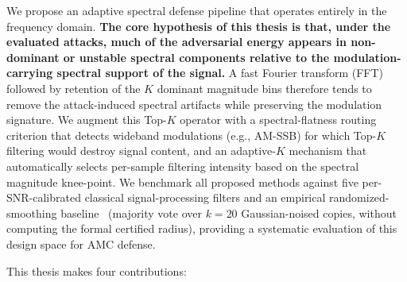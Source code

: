 We propose an adaptive spectral defense pipeline that operates entirely in the
frequency domain. \textbf{The core hypothesis of this thesis is that, under
the evaluated attacks, much of the adversarial energy appears in non-dominant
or unstable spectral components relative to the modulation-carrying spectral
support of the signal.} A fast Fourier transform (FFT) followed by retention
of the $K$ dominant magnitude bins therefore tends to remove the
attack-induced spectral artifacts while preserving the modulation signature.
We augment this Top-$K$ operator with a spectral-flatness routing criterion
that detects wideband modulations (e.g., AM-SSB) for which Top-$K$ filtering
would destroy signal content, and an adaptive-$K$ mechanism that automatically
selects per-sample filtering intensity based on the spectral magnitude
knee-point. We benchmark all proposed methods against five per-SNR-calibrated
classical signal-processing filters and an empirical randomized-smoothing
baseline~\cite{cohen2019certified} (majority vote over $k = 20$
Gaussian-noised copies, without computing the formal certified radius),
providing a systematic evaluation of this design space for AMC defense.

This thesis makes four contributions:

